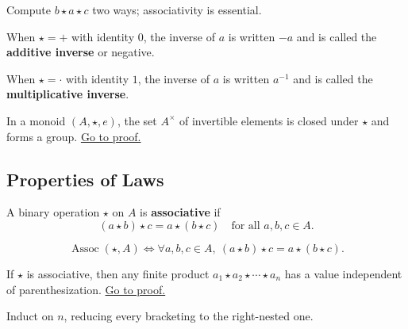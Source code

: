 \begin{remark*}
Compute $b\star a\star c$ two ways; associativity is essential.
\end{remark*}

\begin{definition}
\label{def:additive-inverse}
When $\star=+$ with identity $0$, the inverse of $a$ is written $-a$ and is
called the \textbf{additive inverse} or negative.
\end{definition}

\begin{definition}
\label{def:multiplicative-inverse}
When $\star=\cdot$ with identity $1$, the inverse of $a$ is written
$a^{-1}$ and is called the \textbf{multiplicative inverse}.
\end{definition}

\begin{proposition}
\label{prop:units-form-group}
In a monoid $(A,\star,e)$, the set $A^\times$ of invertible elements is
closed under $\star$ and forms a group.
\hyperref[prf:units-form-group]{Go to proof.}
\end{proposition}

\subsection{Properties of Laws}
\label{sec:properties-of-laws}

\begin{definition}[Associativity]
\label{def:assoc}
A binary operation $\star$ on $A$ is \textbf{associative} if
\[
  (a\star b)\star c=a\star(b\star c)
  \quad\text{for all }a,b,c\in A.
\]
\end{definition}

\begin{remark*}
\[
\operatorname{Assoc}(\star,A)\Longleftrightarrow
\forall a,b,c\in A,\ (a\star b)\star c=a\star(b\star c).
\]
\end{remark*}

\begin{theorem}
\label{thm:general-associativity}
If $\star$ is associative, then any finite product
$a_1\star a_2\star\cdots\star a_n$ has a value independent of
parenthesization.
\hyperref[prf:general-associativity]{Go to proof.}
\end{theorem}

\begin{remark*}
Induct on $n$, reducing every bracketing to the right-nested one.
\end{remark*}

